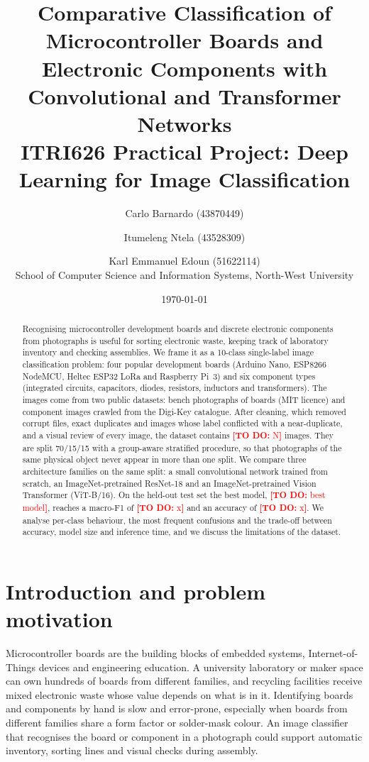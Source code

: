 \documentclass[11pt,a4paper]{article}
\title{\textbf{Comparative Classification of Microcontroller Boards and Electronic Components with Convolutional and Transformer Networks}\\[4pt]
\large ITRI626 Practical Project: Deep Learning for Image Classification}
\author{%
  Carlo Barnardo (43870449) \and
  Itumeleng Ntela (43528309) \and
  Karl Emmanuel Edoun (51622114)\\[6pt]
  \normalsize School of Computer Science and Information Systems, North-West University}
\date{\today}
\newcommand{\fillin}[1]{\textcolor{red}{\textbf{[TO DO:} #1\textbf{]}}}
\providecommand{\NumClasses}{10}
\providecommand{\NumImages}{\fillin{N}}
\providecommand{\BestModel}{\fillin{best model}}
\providecommand{\BestMacroF}{\fillin{x}}
\providecommand{\BestAcc}{\fillin{x}}
\begin{document}
\maketitle
{}

\begin{abstract}
Recognising microcontroller development boards and discrete electronic components from photographs is useful for sorting electronic waste, keeping track of laboratory inventory and checking assemblies. We frame it as a \NumClasses-class single-label image classification problem: four popular development boards (Arduino Nano, ESP8266 NodeMCU, Heltec ESP32 LoRa and Raspberry Pi~3) and six component types (integrated circuits, capacitors, diodes, resistors, inductors and transformers). The images come from two public datasets: bench photographs of boards (MIT licence) and component images crawled from the Digi-Key catalogue. After cleaning, which removed corrupt files, exact duplicates and images whose label conflicted with a near-duplicate, and a visual review of every image, the dataset contains \NumImages{} images. They are split 70/15/15 with a group-aware stratified procedure, so that photographs of the same physical object never appear in more than one split. We compare three architecture families on the same split: a small convolutional network trained from scratch, an ImageNet-pretrained ResNet-18 and an ImageNet-pretrained Vision Transformer (ViT-B/16). On the held-out test set the best model, \BestModel, reaches a macro-F1 of \BestMacroF{} and an accuracy of \BestAcc. We analyse per-class behaviour, the most frequent confusions and the trade-off between accuracy, model size and inference time, and we discuss the limitations of the dataset.
\end{abstract}

\section{Introduction and problem motivation}\label{sec:intro}
Microcontroller boards are the building blocks of embedded systems, Internet-of-Things devices and engineering education. A university laboratory or maker space can own hundreds of boards from different families, and recycling facilities receive mixed electronic waste whose value depends on what is in it. Identifying boards and components by hand is slow and error-prone, especially when boards from different families share a form factor or solder-mask colour. An image classifier that recognises the board or component in a photograph could support automatic inventory, sorting lines and visual checks during assembly.
\end{document}
